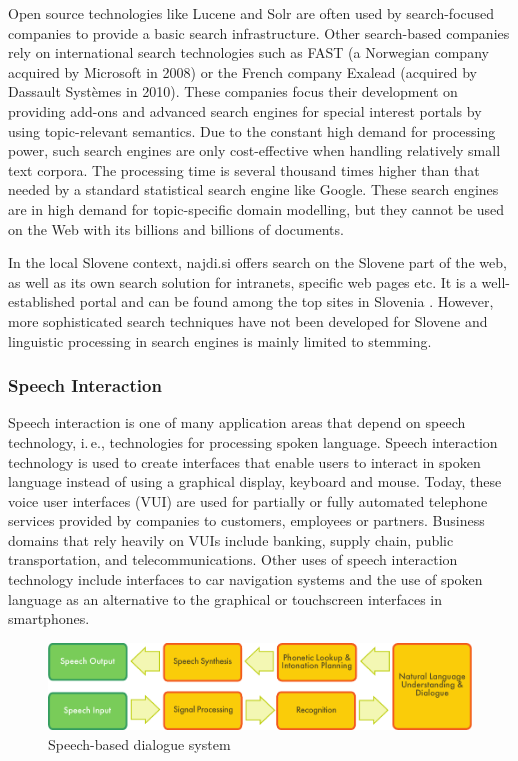 \begin{multicols}{2}
Open source technologies like Lucene and Solr are often used by search-focused companies to provide a basic search infrastructure. Other search-based companies rely on international search technologies such as FAST (a Norwegian company acquired by Microsoft in 2008) or the French company Exalead (acquired by Dassault Systèmes in 2010). These companies focus their development on providing add-ons and advanced search engines for special interest portals by using topic-relevant semantics. Due to the constant high demand for processing power, such search engines are only cost-effective when handling relatively small text corpora. The processing time is several thousand times higher than that needed by a standard statistical search engine like Google. These search engines are in high demand for topic-specific domain modelling, but they cannot be used on the Web with its billions and billions of documents.

In the local Slovene context, najdi.si offers search on the Slovene part of the web, as well as its own search solution for intranets, specific web pages etc. It is a well-established portal and can be found among the top sites in Slovenia \cite{moss1}.  However, more sophisticated search techniques have not been developed for Slovene and linguistic processing in search engines is mainly limited to stemming. 

\subsubsection{Speech Interaction}

Speech interaction is one of many application areas that depend on speech technology, i.\,e., technologies for processing spoken language. Speech interaction technology is used to create interfaces that enable users to interact in spoken language instead of using a graphical display, keyboard and mouse.  Today, these voice user interfaces (VUI) are used for partially or fully automated telephone services provided by companies to customers, employees or partners. Business domains that rely heavily on VUIs include banking, supply chain, public transportation, and telecommunications. Other uses of speech interaction technology include interfaces to car navigation systems and the use of spoken language as an alternative to the graphical or touchscreen interfaces in smartphones.

\begin{figure}[htb]
  \center
  \includegraphics[width=\textwidth]{../_media/english/simple_speech-based_dialogue_architecture}
  \caption{Speech-based dialogue system}
\label{fig:dialoguearch_en}
\end{figure}


\end{multicols}
